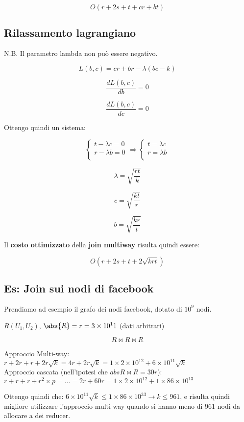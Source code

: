 \documentclass[\main/main.tex]{subfiles}
\begin{document}
\[
	O(r+2s+t+cr+bt)
\]

\subsection{Rilassamento lagrangiano}
N.B. Il parametro lambda non può essere negativo.

\[
	L(b,c) = cr+br - \lambda(bc-k)
\]

\[
	\dfrac{dL(b,c)}{db} = 0
\]

\[
	\dfrac{dL(b,c)}{dc} = 0
\]

Ottengo quindi un sistema:

\[
	\begin{cases}
		t - \lambda c = 0 \\
		r - \lambda b = 0 \\
	\end{cases}
	\Longrightarrow
	\begin{cases}
		t = \lambda c \\
		r = \lambda b \\
	\end{cases}
\]

\[
	\lambda = \sqrt{\dfrac{rt}{k}}
\]

\[
	c = \sqrt{\dfrac{kt}{r}}
\]

\[
	b = \sqrt{\dfrac{kr}{t}}
\]

Il \textbf{costo ottimizzato} della \textbf{join multiway} risulta quindi essere:

\[
	O(r+2s+t+2\sqrt{krt})
\]

\subsection{Es: Join sui nodi di facebook}
Prendiamo ad esempio il grafo dei nodi facebook, dotato di $10^9$ nodi.

$R(U_1, U_2)$, $\abs{R} = r = 3\times10^11$ (dati arbitrari)

\[
	R\Join R \Join R
\]

Approccio Multi-way: $r+2r + r + 2r\sqrt{k} = 4r + 2r\sqrt{k} = 1\times 2\times 10^12 + 6\times 10^11 \sqrt{k}$
\\
Approccio cascata (nell'ipotesi che $abs{R \Join R} = 30r$): $r + r + r + r^2\times p = ... = 2r + 60r = 1 \times 2 \times 10^12 + 1\times 86 \times 10^13$

Ottengo quindi che: $6\times 10^11 \sqrt{k} \leq 1\times 86 \times 10^33 \longrightarrow k \leq 961$, e risulta quindi migliore utilizzare l'approccio multi way quando si hanno meno di 961 nodi da allocare a dei reducer.
\end{document}
